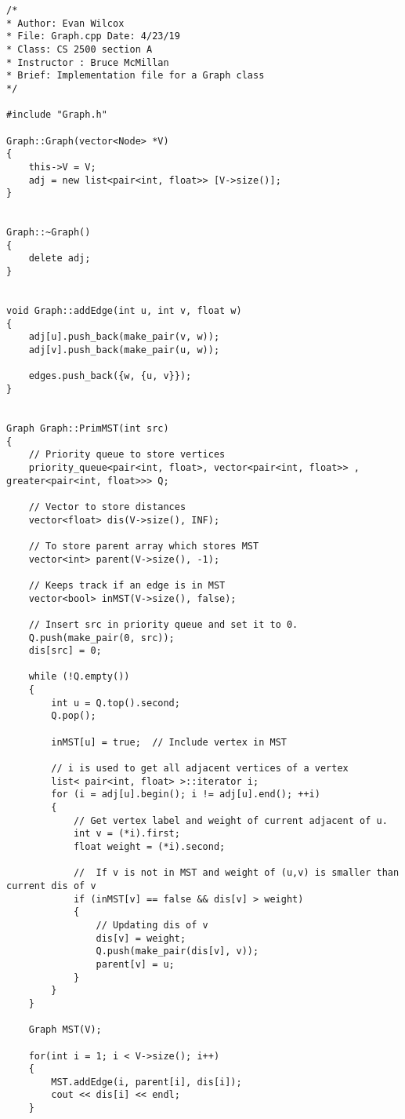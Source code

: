 \documentclass[a4paper]{article}
\begin{document}
    \begin{verbatim}
/*
* Author: Evan Wilcox
* File: Graph.cpp Date: 4/23/19
* Class: CS 2500 section A
* Instructor : Bruce McMillan
* Brief: Implementation file for a Graph class
*/

#include "Graph.h"

Graph::Graph(vector<Node> *V) 
{ 
    this->V = V; 
    adj = new list<pair<int, float>> [V->size()]; 
} 


Graph::~Graph()
{
    delete adj;
}

    
void Graph::addEdge(int u, int v, float w) 
{ 
    adj[u].push_back(make_pair(v, w)); 
    adj[v].push_back(make_pair(u, w)); 
    
    edges.push_back({w, {u, v}});
} 
    

Graph Graph::PrimMST(int src) 
{ 
    // Priority queue to store vertices
    priority_queue<pair<int, float>, vector<pair<int, float>> , greater<pair<int, float>>> Q; 
    
    // Vector to store distances
    vector<float> dis(V->size(), INF); 
    
    // To store parent array which stores MST 
    vector<int> parent(V->size(), -1); 
    
    // Keeps track if an edge is in MST
    vector<bool> inMST(V->size(), false); 
    
    // Insert src in priority queue and set it to 0. 
    Q.push(make_pair(0, src)); 
    dis[src] = 0; 
    
    while (!Q.empty()) 
    { 
        int u = Q.top().second; 
        Q.pop(); 
    
        inMST[u] = true;  // Include vertex in MST 
    
        // i is used to get all adjacent vertices of a vertex 
        list< pair<int, float> >::iterator i; 
        for (i = adj[u].begin(); i != adj[u].end(); ++i) 
        { 
            // Get vertex label and weight of current adjacent of u. 
            int v = (*i).first; 
            float weight = (*i).second; 
    
            //  If v is not in MST and weight of (u,v) is smaller than current dis of v 
            if (inMST[v] == false && dis[v] > weight) 
            { 
                // Updating dis of v 
                dis[v] = weight; 
                Q.push(make_pair(dis[v], v)); 
                parent[v] = u; 
            } 
        } 
    } 
    
    Graph MST(V);

    for(int i = 1; i < V->size(); i++)
    {
        MST.addEdge(i, parent[i], dis[i]);
        cout << dis[i] << endl;
    }


\end{verbatim}
\end{document}
